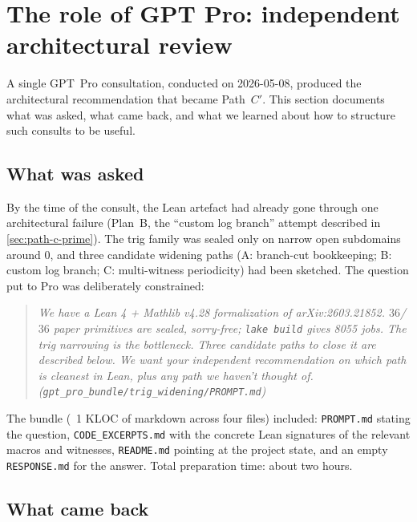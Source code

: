 \documentclass[11pt,a4paper]{article}
\theoremstyle{plain}
\theoremstyle{definition}
\begin{document}
\section{The role of GPT Pro: independent architectural review}
\label{sec:gpt-pro}

A single GPT~Pro consultation, conducted on 2026-05-08, produced the
architectural recommendation that became Path~$C'$. This section
documents what was asked, what came back, and what we learned about
how to structure such consults to be useful.

\subsection*{What was asked}

By the time of the consult, the Lean artefact had already gone
through one architectural failure (Plan~B, the ``custom log branch''
attempt described in \cref{sec:path-c-prime}). The trig family was
sealed only on narrow open subdomains around $0$, and three
candidate widening paths (A: branch-cut bookkeeping; B: custom log
branch; C: multi-witness periodicity) had been sketched. The
question put to Pro was deliberately constrained:

\begin{quote}\itshape\small
We have a Lean 4 + Mathlib v4.28 formalization of arXiv:2603.21852.
$36$/$36$ paper primitives are sealed, sorry-free; \texttt{lake build}
gives 8055 jobs. The trig narrowing is the bottleneck. Three candidate
paths to close it are described below. We want your independent
recommendation on which path is cleanest in Lean, plus any path we
haven't thought of.
\hfill (\texttt{gpt\_pro\_bundle/trig\_widening/PROMPT.md})
\end{quote}

The bundle (~1 KLOC of markdown across four files) included:
\texttt{PROMPT.md} stating the question, \texttt{CODE\_EXCERPTS.md}
with the concrete Lean signatures of the relevant macros and witnesses,
\texttt{README.md} pointing at the project state, and an empty
\texttt{RESPONSE.md} for the answer. Total preparation time: about
two hours.

\subsection*{What came back}
\end{document}

